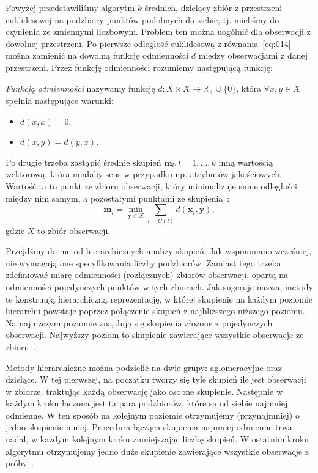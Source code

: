 \documentclass{praca1}
\begin{document}
Powyżej przedstawiliśmy algorytm $k$-średnich, dzielący zbiór z przestrzeni euklidesowej na podzbiory punktów podobnych do siebie, tj. mieliśmy do czynienia ze zmiennymi liczbowym. Problem ten można uogólnić dla obserwacji z dowolnej przestrzeni. Po pierwsze odległość euklidesową z równania~\eqref{eq:014} można zamienić na dowolną funkcję odmienności $d$ między obserwacjami z danej przestrzeni. Przez funkcję odmienności rozumiemy następującą funkcję:

\begin{definition}
\emph{Funkcją odmienności} nazywamy funkcję $d: X\times X \rightarrow \mathbb{R}_+\cup\{0\}$, która $\forall x, y \in X$ spełnia następujące warunki:
\begin{itemize}
\item $d(x,x) = 0$,
\item $d(x,y) = d(y,x)$.
\end{itemize}
\end{definition}

Po drugie trzeba zastąpić średnie skupień $\mathbf{m}_l, l=1,\ldots,k$ inną wartością wektorową, która miałaby sens w przypadku np. atrybutów jakościowych. Wartość ta to punkt ze zbioru obserwacji, który minimalizuje sumę odległości między nim samym, a pozostałymi punktami ze skupienia~\cite{Koronacki2005:statystyczne}:
\begin{equation}
\mathbf{m}_l = \min\limits_{\mathbf{y} \in X} \sum\limits_{i = C(l)} d(\mathbf{x}_i, \mathbf{y}),
\end{equation}
gdzie $X$ to zbiór obserwacji.

Przejdźmy do metod hierarchicznych analizy skupień. Jak wspomniano wcześniej, nie wymagają one specyfikowania liczby podzbiorów. Zamiast tego trzeba zdefiniować miarę odmienności (rozłącznych) zbiorów obserwacji, opartą na odmienności pojedynczych punktów w tych zbiorach. Jak sugeruje nazwa, metody te konstruują hierarchiczną reprezentację, w której skupienie na każdym poziomie hierarchii powstaje poprzez połączenie skupień z najbliższego niższego poziomu. Na najniższym poziomie znajdują się skupienia złożone z pojedynczych obserwacji. Najwyższy poziom to skupienie zawierające wszystkie obserwacje ze zbioru~\cite{Hastie2009:elements}.

Metody hierarchiczne można podzielić na dwie grupy: aglomeracyjne oraz dzielące. W tej pierwszej, na początku tworzy się tyle skupień ile jest obserwacji w zbiorze, traktując każdą obserwację jako osobne skupienie. Następnie w każdym kroku łączona jest ta para podzbiorów, które są od siebie najmniej odmienne. W ten sposób na kolejnym poziomie otrzymujemy (przynajmniej) o jedno skupienie mniej. Procedura łącząca skupienia najmniej odmienne trwa nadal, w każdym kolejnym kroku zmniejszając liczbę skupień. W ostatnim kroku algorytmu otrzymujemy jedno duże skupienie zawierające wszystkie obserwacje z próby~\cite{Hastie2009:elements, Koronacki2005:statystyczne}.
\end{document}
